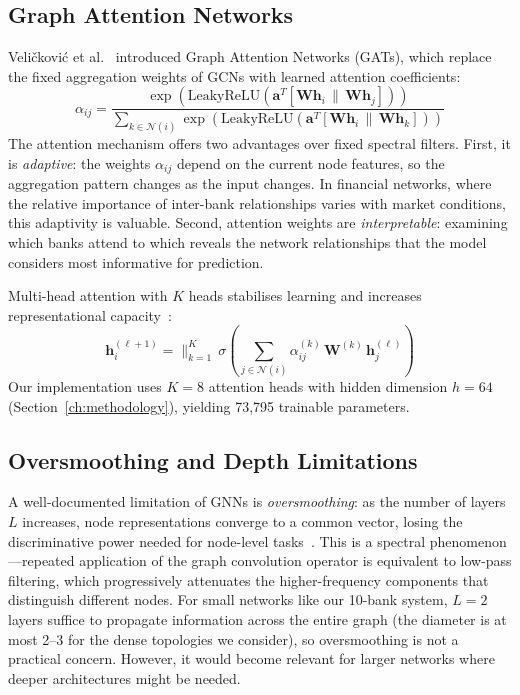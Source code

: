 \subsection{Graph Attention Networks}
\label{sec:gat_background}

Veli\v{c}kovi\'c et al.~\cite{velickovic2018graph} introduced Graph
Attention Networks (GATs), which replace the fixed aggregation weights
of GCNs with learned attention coefficients:
\begin{equation}
\alpha_{ij} = \frac{
  \exp\!\left(\text{LeakyReLU}\!\left(\mathbf{a}^T\!
  \left[\mathbf{W}\mathbf{h}_i \,\|\, \mathbf{W}\mathbf{h}_j\right]
  \right)\right)}{
  \sum_{k \in \mathcal{N}(i)}
  \exp\!\left(\text{LeakyReLU}\!\left(\mathbf{a}^T\!
  \left[\mathbf{W}\mathbf{h}_i \,\|\, \mathbf{W}\mathbf{h}_k\right]
  \right)\right)}
\label{eq:gat_attn}
\end{equation}
The attention mechanism offers two advantages over fixed spectral
filters.  First, it is \emph{adaptive}: the weights $\alpha_{ij}$
depend on the current node features, so the aggregation pattern changes
as the input changes.  In financial networks, where the relative
importance of inter-bank relationships varies with market conditions,
this adaptivity is valuable.  Second, attention weights are
\emph{interpretable}: examining which banks attend to which reveals
the network relationships that the model considers most informative for
prediction.

Multi-head attention with $K$ heads stabilises learning and increases
representational capacity~\cite{velickovic2018graph}:
\begin{equation}
\mathbf{h}_i^{(\ell+1)} = \Big\|_{k=1}^{K}\,\sigma\!\left(
\sum_{j \in \mathcal{N}(i)} \alpha_{ij}^{(k)}\,
\mathbf{W}^{(k)}\,\mathbf{h}_j^{(\ell)}\right)
\label{eq:multihead_attn}
\end{equation}
Our implementation uses $K=8$ attention heads with hidden dimension
$h=64$ (Section~\ref{ch:methodology}), yielding 73{,}795 trainable
parameters.

\subsection{Oversmoothing and Depth Limitations}
\label{sec:oversmoothing}

A well-documented limitation of GNNs is \emph{oversmoothing}: as the
number of layers $L$ increases, node representations converge to a
common vector, losing the discriminative power needed for node-level
tasks~\cite{kipf2017semi}.  This is a spectral phenomenon---repeated
application of the graph convolution operator is equivalent to
low-pass filtering, which progressively attenuates the higher-frequency
components that distinguish different nodes.  For small networks like
our 10-bank system, $L=2$ layers suffice to propagate information
across the entire graph (the diameter is at most 2--3 for the dense
topologies we consider), so oversmoothing is not a practical concern.
However, it would become relevant for larger networks where deeper
architectures might be needed.

